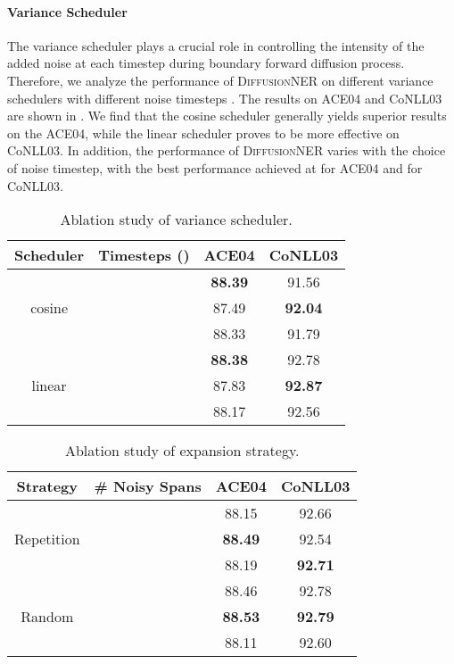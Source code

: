 \documentclass[11pt]{article}
\begin{document}
\paragraph{Variance Scheduler}
The variance scheduler plays a crucial role in controlling the intensity of the added noise at each timestep during boundary forward diffusion process. Therefore, we analyze the performance of \textsc{DiffusionNER} on different variance schedulers with different noise timesteps . The results on ACE04 and CoNLL03 are shown in . We find that the cosine scheduler generally yields superior results on the ACE04, while the linear scheduler proves to be more effective on CoNLL03. In addition, the performance of \textsc{DiffusionNER} varies with the choice of noise timestep, with the best performance achieved at  for ACE04 and  for CoNLL03.


\begin{table}[]
    \centering
    \small
    \begin{tabular}{cccc}
    \toprule
    Scheduler & Timesteps () & ACE04 & CoNLL03\\
    \midrule
     \multirow{3}{*}{cosine} 
     & & \textbf{88.39}  & 91.56  \\
     & & 87.49 & \textbf{92.04}\\
     & & 88.33 & 91.79\\
    \midrule
    \multirow{3}{*}{linear} 
     & & \textbf{88.38}  & 92.78 \\
     & & 87.83 & \textbf{92.87} \\
     & & 88.17 & 92.56\\
    \bottomrule
    \end{tabular}
    \caption{Ablation study of variance scheduler. }
    \label{tab:variancescheduler}
\end{table}


\begin{table}[]
    \centering
    \small
    \begin{tabular}{cccc}
    \toprule
    Strategy & \# Noisy Spans& ACE04 & CoNLL03\\
    \midrule
     \multirow{3}{*}{Repetition} 
     & & 88.15  & 92.66 \\
     & & \textbf{88.49} & 92.54 \\
     & & 88.19 & \textbf{92.71} \\
    \midrule
    \multirow{3}{*}{Random} 
    &  & 88.46 & 92.78 \\
    &  & \textbf{88.53} & \textbf{92.79} \\
    &  & 88.11 & 92.60 \\
    \bottomrule
    \end{tabular}
    \caption{Ablation study of expansion strategy. }
    \label{tab:expansionstrategy}
\end{table}
\end{document}
